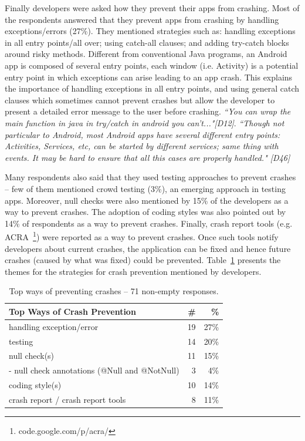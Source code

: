 Finally developers were asked how they prevent their apps from crashing. Most of the respondents answered that they prevent apps from crashing by handling exceptions/errors (27\%). They mentioned strategies such as: handling exceptions in all entry points/all over; using catch-all clauses; and adding try-catch blocks around risky methods. Different from conventional Java programs, an Android app is composed of several entry points, each window (i.e. Activity) is a potential entry point in which exceptions can arise leading to an app crash. This explains the importance of handling exceptions in all entry points, and using general catch clauses which sometimes cannot prevent crashes but allow the developer to present a detailed error message to the user before crashing.  \emph{``You can wrap the main function in java in try/catch in android you can't..."[D12]}. \emph{``Though not particular to Android, most Android apps have several different entry points: Activities, Services, etc, can be started by different services; same thing with events. It may be hard to ensure that all this cases are properly handled." [D46]}

Many respondents also said that they used testing approaches to prevent crashes -- few of them mentioned crowd testing (3\%), an emerging approach in testing apps. Moreover, null checks were also mentioned by 15\% of the developers as a way to prevent crashes. 
The adoption of coding styles was also pointed out by 14\% of respondents as a way to prevent crashes. Finally, crash report tools (e.g. ACRA~\footnote{code.google.com/p/acra/}) were reported as a way to prevent crashes. Once such tools notify developers about current crashes, the application can be fixed and hence future crashes (caused by what was fixed) could be prevented. Table~\ref{tab:topprevent} presents the themes for the strategies for crash prevention mentioned by developers.	 					
		
\bigskip 


\bigskip 
				
\begin{table}
\scriptsize
\centering
\begin{tabular}{lrr}
\hline
\bfseries{Top Ways of Crash Prevention} & \bfseries{\#} & \bfseries{\%} \\
\hline
handling exception/error  & 19 &	27\% \\
testing &	14 &	20\% \\
null check(s) &	11 &	15\% \\
- null check annotations (@Null and @NotNull)	& 3 & 	4\% \\
coding style(s)	& 10 &	14\% \\
crash report / crash report tools &	8	& 11\% \\
\hline
\end{tabular}
\caption{Top ways of preventing crashes -- 71 non-empty responses. }
\label{tab:topprevent}
\end{table}

